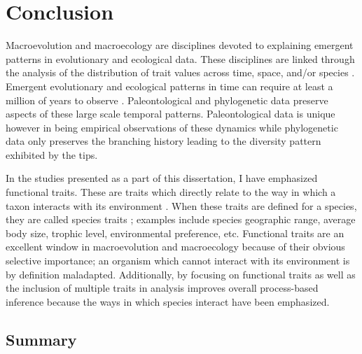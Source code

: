 \chapter{Conclusion} \label{ch:conclusion}



Macroevolution and macroecology are disciplines devoted to explaining emergent patterns in evolutionary and ecological data. These disciplines are linked through the analysis of the distribution of trait values across time, space, and/or species \citep{Mcgill2006,Weber2017}. Emergent evolutionary and ecological patterns in time can require at least a million of years to observe \citep{Uyeda2011a}. Paleontological and phylogenetic data preserve aspects of these large scale temporal patterns. Paleontological data is unique however in being empirical observations of these dynamics while phylogenetic data only preserves the branching history leading to the diversity pattern exhibited by the tips.

In the studies presented as a part of this dissertation, I have emphasized functional traits. These are traits which directly relate to the way in which a taxon interacts with its environment \citep{Mcgill2006}. When these traits are defined for a species, they are called species traits \citep{Mcgill2006}; examples include species geographic range, average body size, trophic level, environmental preference, etc. Functional traits are an excellent window in macroevolution and macroecology because of their obvious selective importance; an organism which cannot interact with its environment is by definition maladapted. Additionally, by focusing on functional traits as well as the inclusion of multiple traits in analysis improves overall process-based inference because the ways in which species interact have been emphasized.


\section{Summary}

